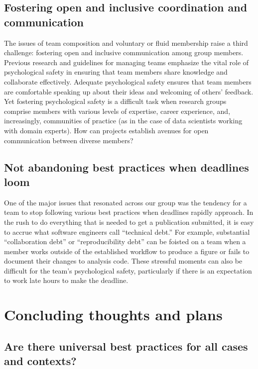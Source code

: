 \documentclass[11pt]{elife}
\begin{document}
\subsection{Fostering open and inclusive coordination and communication}

The issues of team composition and voluntary or fluid membership raise a third challenge: fostering open and inclusive communication among group members. Previous research and guidelines for managing teams \citep{Edmondson1999,GooglereWork2017} emphasize the vital role of psychological safety in ensuring that team members share knowledge and collaborate effectively. Adequate psychological safety ensures that team members are comfortable speaking up about their ideas and welcoming of others’ feedback. Yet fostering psychological safety is a difficult task when research groups comprise members with various levels of expertise, career experience, and, increasingly, communities of practice (as in the case of data scientists working with domain experts). How can projects establish avenues for open communication between diverse members?

\subsection{Not abandoning best practices when deadlines loom}

One of the major issues that resonated across our group was the tendency for a team to stop following various best practices when deadlines rapidly approach. In the rush to do everything that is needed to get a publication submitted, it is easy to accrue what software engineers call “technical debt.” For example, substantial “collaboration debt” or “reproducibility debt” can be foisted on a team when a member works outside of the established workflow to produce a figure or fails to document their changes to analysis code. These stressful moments can also be difficult for the team’s psychological safety, particularly if there is an expectation to work late hours to make the deadline.

\section{Concluding thoughts and plans}
 
\subsection{Are there universal best practices for all cases and contexts?}
\end{document}

